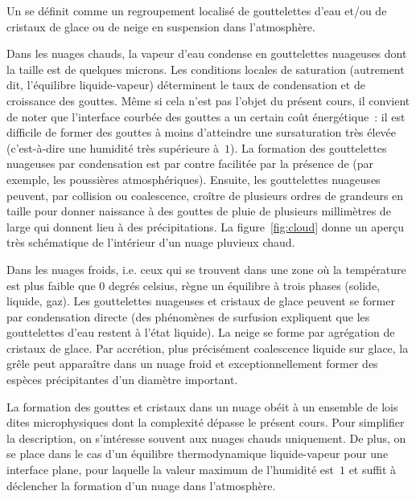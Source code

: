 Un  se définit comme un regroupement localisé de gouttelettes d'eau et/ou de cristaux de glace ou de neige en suspension dans l'atmosphère. 


\begin{finger}
\item Dans les nuages chauds, la vapeur d'eau condense en gouttelettes nuageuses dont la taille est de quelques microns. Les conditions locales de saturation (autrement dit, l'équilibre liquide-vapeur) déterminent le taux de condensation et de croissance des gouttes. Même si cela n'est pas l'objet du présent cours, il convient de noter que l'interface courbée des gouttes a un certain coût énergétique~: il est difficile de former des gouttes à moins d'atteindre une sursaturation très élevée (c'est-à-dire une humidité très supérieure à~$1$). La formation des gouttelettes nuageuses par condensation est par contre facilitée par la présence de  (par exemple, les poussières atmosphériques). Ensuite, les gouttelettes nuageuses peuvent, par collision ou coalescence, croître de plusieurs ordres de grandeurs en taille pour donner naissance à des gouttes de pluie de plusieurs millimètres de large qui donnent lieu à des précipitations. La figure~\ref{fig:cloud} donne un aperçu très schématique de l'intérieur d'un nuage pluvieux chaud.
\item Dans les nuages froids, i.e. ceux qui se trouvent dans une zone où la température est plus faible que 0 degrés celsius, règne un équilibre à trois phases (solide, liquide, gaz). Les gouttelettes nuageuses et cristaux de glace peuvent se former par condensation directe (des phénomènes de surfusion expliquent que les gouttelettes d'eau restent à l'état liquide). La neige se forme par agrégation de cristaux de glace. Par accrétion, plus précisément coalescence liquide sur glace, la grêle peut apparaître dans un nuage froid et exceptionnellement former des espèces précipitantes d'un diamètre important.
\end{finger}

\sk
La formation des gouttes et cristaux dans un nuage obéit à un ensemble de lois dites microphysiques dont la complexité dépasse le présent cours. Pour simplifier la description, on s'intéresse souvent aux nuages chauds uniquement. De plus, on se place dans le cas d'un équilibre thermodynamique liquide-vapeur pour une interface plane, pour laquelle la valeur maximum de l'humidité est~$1$ et suffit à déclencher la formation d'un nuage dans l'atmosphère.



